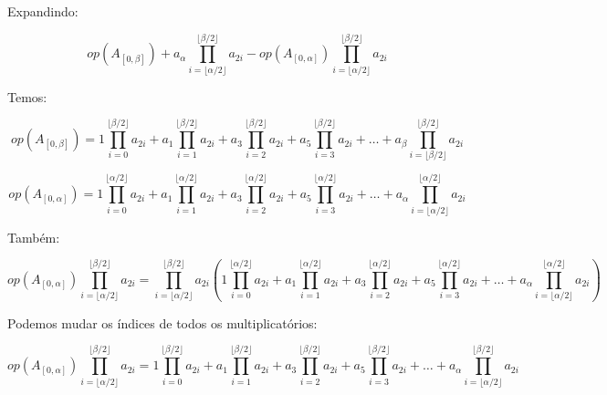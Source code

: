\documentclass{article}
\begin{document}
Expandindo:

\begin{equation*}
op(A_{[0,\beta]}) + a_\alpha\prod_{i=\lfloor\alpha/2\rfloor}^{\lfloor\beta/2\rfloor} a_{2i} - op(A_{[0,\alpha]})\prod_{i=\lfloor\alpha/2\rfloor}^{\lfloor\beta/2\rfloor} a_{2i} 
\end{equation*}

Temos:

\begin{equation*}
op(A_{[0,\beta]}) = 1 \prod_{i=0}^{\lfloor \beta/2 \rfloor} a_{2i} + a_1 \prod_{i=1}^{\lfloor \beta/2 \rfloor } a_{2i} + a_3 \prod_{i=2}^{\lfloor \beta/2 \rfloor} a_{2i} + a_ 5 \prod_{i=3}^{\lfloor \beta/2 \rfloor} a_{2i} + \dots + a_\beta \prod_{i=\lfloor \beta/2 \rfloor}^{\lfloor \beta/2 \rfloor} a_{2i}
\end{equation*}

\begin{equation*}
op(A_{[0,\alpha]}) = 1 \prod_{i=0}^{\lfloor \alpha/2 \rfloor} a_{2i} + a_1 \prod_{i=1}^{\lfloor \alpha/2 \rfloor } a_{2i} + a_3 \prod_{i=2}^{\lfloor \alpha/2 \rfloor} a_{2i} + a_ 5 \prod_{i=3}^{\lfloor \alpha/2 \rfloor} a_{2i} + \dots + a_\alpha \prod_{i=\lfloor \alpha/2 \rfloor}^{\lfloor \alpha/2 \rfloor} a_{2i}
\end{equation*}

Também:

\begin{equation*}
op(A_{[0,\alpha]})\prod_{i=\lfloor\alpha/2\rfloor}^{\lfloor\beta/2\rfloor} a_{2i} = \prod_{i=\lfloor\alpha/2\rfloor}^{\lfloor\beta/2\rfloor} a_{2i} (1 \prod_{i=0}^{\lfloor \alpha/2 \rfloor} a_{2i} + a_1 \prod_{i=1}^{\lfloor \alpha/2 \rfloor } a_{2i} + a_3 \prod_{i=2}^{\lfloor \alpha/2 \rfloor} a_{2i} + a_ 5 \prod_{i=3}^{\lfloor \alpha/2 \rfloor} a_{2i} + \dots + a_\alpha \prod_{i=\lfloor \alpha/2 \rfloor}^{\lfloor \alpha/2 \rfloor} a_{2i})
\end{equation*}

Podemos mudar os índices de todos os multiplicatórios:

\begin{equation*}
op(A_{[0,\alpha]})\prod_{i=\lfloor\alpha/2\rfloor}^{\lfloor\beta/2\rfloor} a_{2i} = 1 \prod_{i=0}^{\lfloor\beta/2\rfloor} a_{2i} + a_1 \prod_{i=1}^{\lfloor\beta/2\rfloor } a_{2i} + a_3 \prod_{i=2}^{\lfloor\beta/2\rfloor} a_{2i} + a_ 5 \prod_{i=3}^{\lfloor\beta/2\rfloor} a_{2i} + \dots + a_\alpha \prod_{i=\lfloor \alpha/2 \rfloor}^{\lfloor\beta/2\rfloor} a_{2i}
\end{equation*}
\end{document}
